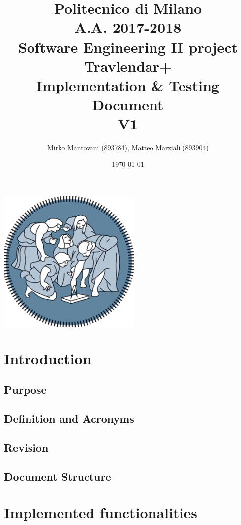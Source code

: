 \documentclass{article}
\author{Mirko Mantovani (893784), Matteo Marziali (893904)}
\date{\today}
\title{Politecnico di Milano
	\\A.A. 2017\@-\@2018
	\\Software Engineering II project \\ \textbf{Travlendar+}
	\\
	\textbf{I}mplementation \& \textbf{T}esting 
	\\ \textbf{D}ocument 
	\\
	\textbf{V1}}
\begin{document}
\maketitle
\begin{center}
	\includegraphics[width=7cm]{polimi-logo}
\end{center}
\clearpage
{\hypersetup{hidelinks}\tableofcontents}

\clearpage

\section{Introduction}
\subsection{Purpose}


\subsection{Definition and Acronyms}



\subsection{Revision}

\subsection{Document Structure}


\clearpage
\section{Implemented functionalities}

\end{document}
